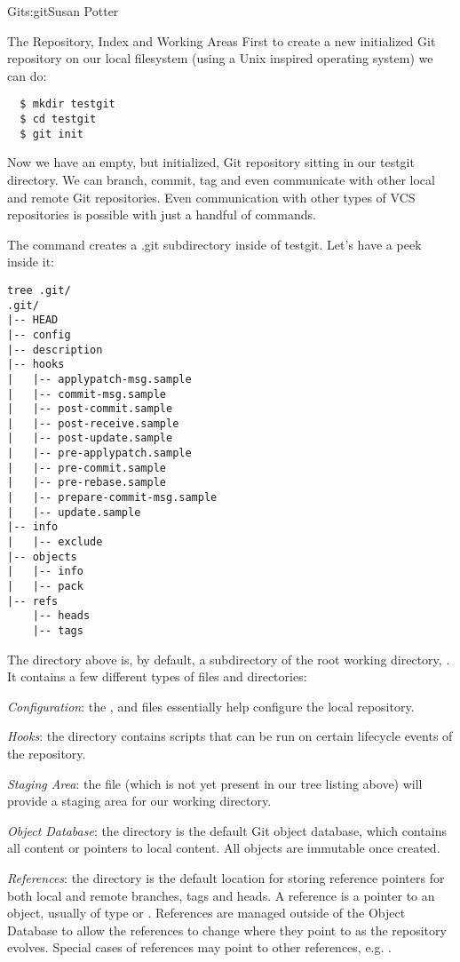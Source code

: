 \begin{aosachapter}{Git}{s:git}{Susan Potter}
\begin{aosasect1}{The Repository, Index and Working Areas}
First to create a new initialized Git repository on our local filesystem
(using a Unix inspired operating system) we can do:
\begin{verbatim}
  $ mkdir testgit
  $ cd testgit
  $ git init
\end{verbatim}

\noindent Now we have an empty, but initialized, Git repository sitting in our testgit
directory. We can branch, commit, tag and even communicate with other local
and remote Git repositories. Even communication with other types of VCS
repositories is possible with just a handful of  commands.

The  command creates a .git subdirectory inside of testgit.
Let's have a peek inside it:
\begin{verbatim}
tree .git/
.git/
|-- HEAD
|-- config
|-- description
|-- hooks
|   |-- applypatch-msg.sample
|   |-- commit-msg.sample
|   |-- post-commit.sample
|   |-- post-receive.sample
|   |-- post-update.sample
|   |-- pre-applypatch.sample
|   |-- pre-commit.sample
|   |-- pre-rebase.sample
|   |-- prepare-commit-msg.sample
|   |-- update.sample
|-- info
|   |-- exclude
|-- objects
|   |-- info
|   |-- pack
|-- refs
    |-- heads
    |-- tags
\end{verbatim}

The  directory above is, by default, a subdirectory of the root working
directory, . It contains a few different types of files and
directories:

\begin{aosaitemize}
  \item \emph{Configuration}: the ,  and
   files essentially help configure the local repository.
  \item \emph{Hooks}: the  directory contains scripts that can
  be run on certain lifecycle events of the repository.
  \item \emph{Staging Area}: the  file (which is not yet
  present in our tree listing above) will provide a staging area for our
  working directory.
  \item \emph{Object Database}: the  directory is the default
  Git object database, which contains all content or pointers to local
  content. All objects are immutable once created.
  \item \emph{References}: the  directory is the default location
  for storing reference pointers for both local and remote branches, tags and
  heads. A reference is a pointer to an object, usually of type  or
  . References are managed outside of the Object Database to
  allow the references to change where they point to as the repository
  evolves. Special cases of references may point to other references, e.g.
  .
\end{aosaitemize}


\end{aosasect1}
\end{aosachapter}
